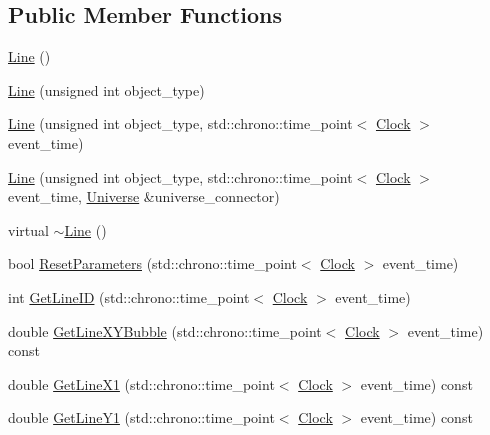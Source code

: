 \subsection*{Public Member Functions}
\begin{DoxyCompactItemize}
\item 
\mbox{\hyperlink{class_line_acc11b8a429d8cdd63ba6803dff5602b3}{Line}} ()
\item 
\mbox{\hyperlink{class_line_a4e3242660d8d3c1aa43e932560840552}{Line}} (unsigned int object\+\_\+type)
\item 
\mbox{\hyperlink{class_line_a5330353765ab0f965a4293bdc7c3564a}{Line}} (unsigned int object\+\_\+type, std\+::chrono\+::time\+\_\+point$<$ \mbox{\hyperlink{universe_8h_a0ef8d951d1ca5ab3cfaf7ab4c7a6fd80}{Clock}} $>$ event\+\_\+time)
\item 
\mbox{\hyperlink{class_line_a740aacdf468a1519f9a01d9cbd1f9219}{Line}} (unsigned int object\+\_\+type, std\+::chrono\+::time\+\_\+point$<$ \mbox{\hyperlink{universe_8h_a0ef8d951d1ca5ab3cfaf7ab4c7a6fd80}{Clock}} $>$ event\+\_\+time, \mbox{\hyperlink{class_universe}{Universe}} \&universe\+\_\+connector)
\item 
virtual \mbox{\hyperlink{class_line_a4a95bafcefa28672b3999deb011b9e50}{$\sim$\+Line}} ()
\item 
bool \mbox{\hyperlink{class_line_af1756d1500ab0a5616313be6e213015a}{Reset\+Parameters}} (std\+::chrono\+::time\+\_\+point$<$ \mbox{\hyperlink{universe_8h_a0ef8d951d1ca5ab3cfaf7ab4c7a6fd80}{Clock}} $>$ event\+\_\+time)
\item 
int \mbox{\hyperlink{class_line_a20756feda4d42032955ec6cf12d89941}{Get\+Line\+ID}} (std\+::chrono\+::time\+\_\+point$<$ \mbox{\hyperlink{universe_8h_a0ef8d951d1ca5ab3cfaf7ab4c7a6fd80}{Clock}} $>$ event\+\_\+time)
\item 
double \mbox{\hyperlink{class_line_a8752cfce7330fbeda936778b77e534d0}{Get\+Line\+X\+Y\+Bubble}} (std\+::chrono\+::time\+\_\+point$<$ \mbox{\hyperlink{universe_8h_a0ef8d951d1ca5ab3cfaf7ab4c7a6fd80}{Clock}} $>$ event\+\_\+time) const
\item 
double \mbox{\hyperlink{class_line_ab14245ec4348e925b6e0f860e9254308}{Get\+Line\+X1}} (std\+::chrono\+::time\+\_\+point$<$ \mbox{\hyperlink{universe_8h_a0ef8d951d1ca5ab3cfaf7ab4c7a6fd80}{Clock}} $>$ event\+\_\+time) const
\item 
double \mbox{\hyperlink{class_line_ac09a53b36a300c38191269f110c73eb1}{Get\+Line\+Y1}} (std\+::chrono\+::time\+\_\+point$<$ \mbox{\hyperlink{universe_8h_a0ef8d951d1ca5ab3cfaf7ab4c7a6fd80}{Clock}} $>$ event\+\_\+time) const

\end{DoxyCompactItemize}
